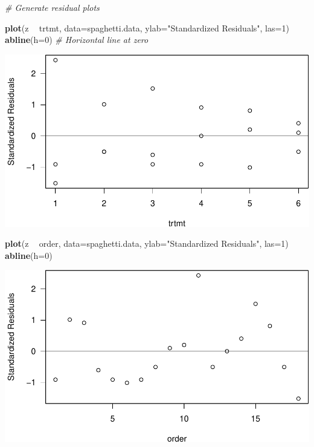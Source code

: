 \documentclass[12pt,]{article}
\newenvironment{Shaded}{\begin{snugshade}}{\end{snugshade}}
\newcommand{\KeywordTok}[1]{\textcolor[rgb]{0.13,0.29,0.53}{\textbf{#1}}}
\newcommand{\DataTypeTok}[1]{\textcolor[rgb]{0.13,0.29,0.53}{#1}}
\newcommand{\DecValTok}[1]{\textcolor[rgb]{0.00,0.00,0.81}{#1}}
\newcommand{\StringTok}[1]{\textcolor[rgb]{0.31,0.60,0.02}{#1}}
\newcommand{\CommentTok}[1]{\textcolor[rgb]{0.56,0.35,0.01}{\textit{#1}}}
\newcommand{\OperatorTok}[1]{\textcolor[rgb]{0.81,0.36,0.00}{\textbf{#1}}}
\newcommand{\NormalTok}[1]{#1}
\begin{document}
\begin{Shaded}
\begin{Highlighting}[]
\CommentTok{# Generate residual plots}


\KeywordTok{plot}\NormalTok{(z }\OperatorTok{~}\StringTok{ }\NormalTok{trtmt, }\DataTypeTok{data=}\NormalTok{spaghetti.data, }\DataTypeTok{ylab=}\StringTok{"Standardized Residuals"}\NormalTok{, }\DataTypeTok{las=}\DecValTok{1}\NormalTok{)}
\KeywordTok{abline}\NormalTok{(}\DataTypeTok{h=}\DecValTok{0}\NormalTok{)  }\CommentTok{# Horizontal line at zero}
\end{Highlighting}
\end{Shaded}

\includegraphics{Markdown_HW_5_files/figure-latex/unnamed-chunk-6-1.pdf}

\begin{Shaded}
\begin{Highlighting}[]
\KeywordTok{plot}\NormalTok{(z }\OperatorTok{~}\StringTok{ }\NormalTok{order, }\DataTypeTok{data=}\NormalTok{spaghetti.data, }\DataTypeTok{ylab=}\StringTok{"Standardized Residuals"}\NormalTok{, }\DataTypeTok{las=}\DecValTok{1}\NormalTok{)}
\KeywordTok{abline}\NormalTok{(}\DataTypeTok{h=}\DecValTok{0}\NormalTok{)}
\end{Highlighting}
\end{Shaded}

\includegraphics{Markdown_HW_5_files/figure-latex/unnamed-chunk-6-2.pdf}
\end{document}

